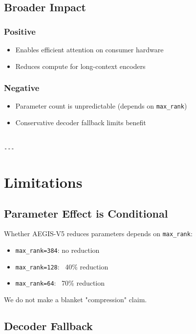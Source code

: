 \subsection{Broader Impact}

\subsubsection{Positive}
\begin{itemize}
\item Enables efficient attention on consumer hardware
\item Reduces compute for long-context encoders

\end{itemize}
\subsubsection{Negative}
\begin{itemize}
\item Parameter count is unpredictable (depends on \texttt{max\_rank})
\item Conservative decoder fallback limits benefit
\end{itemize}
\begin{lstlisting}

---
\end{lstlisting}

\section{Limitations}

\subsection{Parameter Effect is Conditional}

Whether AEGIS-V5 reduces parameters depends on \texttt{max\_rank}:

\begin{itemize}
\item \texttt{max\_rank=384}: no reduction
\item \texttt{max\_rank=128}: ~40\% reduction
\item \texttt{max\_rank=64}: ~70\% reduction

\end{itemize}
We do not make a blanket "compression" claim.

\subsection{Decoder Fallback}


